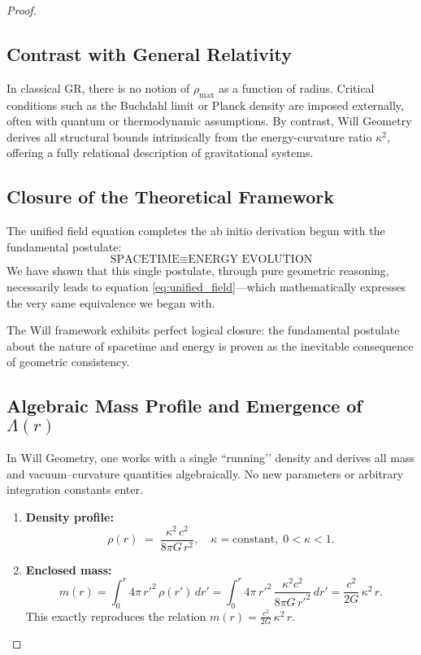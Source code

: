 \documentclass{article}
\begin{document}
\begin{proof}
\subsection*{Contrast with General Relativity}

In classical GR, there is no notion of \( \rho_{\text{max}} \) as a function of radius. Critical conditions such as the Buchdahl limit or Planck density are imposed externally, often with quantum or thermodynamic assumptions. By contrast, Will Geometry derives all structural bounds intrinsically from the energy-curvature ratio \( \kappa^2 \), offering a fully relational description of gravitational systems.


\subsection{Closure of the Theoretical Framework}

The unified field equation completes the ab initio derivation begun with the fundamental postulate:
\[
\text{SPACETIME} \equiv \text{ENERGY EVOLUTION}
\]
We have shown that this single postulate, through pure geometric reasoning, necessarily leads to equation \eqref{eq:unified_field}—which mathematically expresses the very same equivalence we began with.

\begin{tcolorbox}[colback=gray!5, colframe=black!80!black, title=Theoretical Ouroboros]
The Will framework exhibits perfect logical closure: the fundamental postulate about the nature of spacetime and energy is proven as the inevitable consequence of geometric consistency.
\end{tcolorbox}

\subsection{Algebraic Mass Profile and Emergence of \(\Lambda(r)\)}

In Will Geometry, one works with a single “running’’ density and derives all mass and vacuum–curvature quantities algebraically.  No new parameters or arbitrary integration constants enter.

\begin{enumerate}
  \item \textbf{Density profile:}
  \[
    \rho(r)
    \;=\;
    \frac{\kappa^2\,c^2}{8\pi G\,r^2},
    \quad
    \kappa=\text{constant},\;0<\kappa<1.
  \]
  
  \item \textbf{Enclosed mass:}
  \[
    m(r)
    =\int_{0}^{r}4\pi\,r'^{2}\,\rho(r')\,dr'
    =\int_{0}^{r}4\pi\,r'^{2}\,\frac{\kappa^2c^2}{8\pi G\,r'^{2}}\,dr'
    =\frac{c^2}{2G}\,\kappa^2\,r.
  \]
  This exactly reproduces the relation
  \(\displaystyle m(r)=\frac{c^2}{2G}\,\kappa^2\,r.\)
  

\end{enumerate}
\end{proof}
\end{document}
